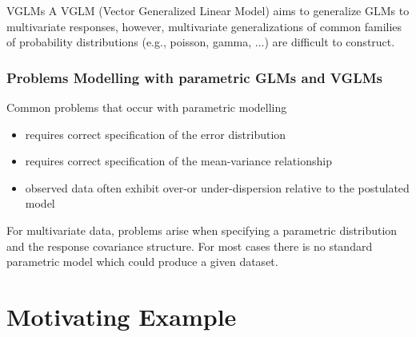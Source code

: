 \documentclass[9pt,notes=hide]{beamer}
\begin{document}
\begin{frame}{VGLMs}
	A VGLM (Vector Generalized Linear Model)  aims to generalize GLMs to
	multivariate responses, however,  multivariate generalizations of common
	families of probability distributions (e.g., poisson, gamma, ...) are
	difficult to construct.
\end{frame}



\begin{frame}
	\frametitle{Problems Modelling with parametric GLMs and VGLMs}
	Common problems that occur with parametric modelling\pause
	\pause[\thebeamerpauses]
	\begin{itemize}[<+->]
		\item requires correct specification of the error distribution
		\item requires correct specification of the mean-variance relationship
		\item observed data often exhibit over-or under-dispersion relative to the postulated model
	\end{itemize}
	\pause[\thebeamerpauses]
	For multivariate data, problems arise when specifying a parametric distribution and the response covariance structure.
	For most cases there is no standard parametric model which could produce a given dataset.
\end{frame}


\section{Motivating Example}
\end{document}
